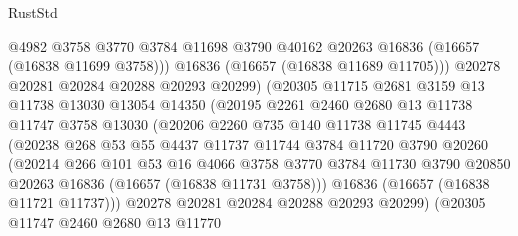 \begin{lexlean}{RustStd}
\begin{coremodule}
                        @4982
                        @3758
                        @3770
                        @3784
                        @11698
                        @3790
                        @40162
                        @20263
                        @16836
                        (@16657 (@16838 @11699 @3758)))
                      @16836
                      (@16657 (@16838 @11689 @11705)))
                    @20278
                    @20281
                    @20284
                    @20288
                    @20293
                    @20299)
                  (@20305
                    @11715
                    @2681
                    @3159
                    @13
                    @11738
                    @13030
                    @13054
                    @14350
                    (@20195
                      @2261
                      @2460
                      @2680
                      @13
                      @11738
                      @11747
                      @3758
                      @13030
                      (@20206
                        @2260
                        @735
                        @140
                        @11738
                        @11745
                        @4443
                        (@20238
                          @268
                          @53
                          @55
                          @4437
                          @11737
                          @11744
                          @3784
                          @11720
                          @3790
                          @20260
                          (@20214
                            @266
                            @101
                            @53
                            @16
                            @4066
                            @3758
                            @3770
                            @3784
                            @11730
                            @3790
                            @20850
                            @20263
                            @16836
                            (@16657 (@16838 @11731 @3758)))
                          @16836
                          (@16657 (@16838 @11721 @11737)))
                        @20278
                        @20281
                        @20284
                        @20288
                        @20293
                        @20299)
                      (@20305
                        @11747
                        @2460
                        @2680
                        @13
                        @11770

\end{coremodule}
\end{lexlean}
